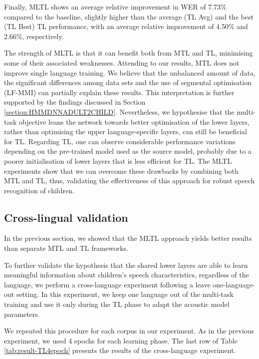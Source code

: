 Finally, \ac{MLTL} shows an average relative improvement in \ac{WER} of 7.73\%  compared to the baseline, slightly higher than the average (\ac{TL} Avg) and the best (\ac{TL} Best) \ac{TL} performance, with an average relative improvement of 4.50\% and 2.66\%, respectively. 

The strength of \ac{MLTL} is that it can benefit both from \ac{MTL} and \ac{TL}, minimising some of their associated weaknesses.
Attending to our results, \ac{MTL} does not improve single language training. We believe that the unbalanced amount of data, the significant differences among data sets and the use of segmental optimisation (\ac{LF-MMI}) can partially explain these results. This interpretation is further supported by the findings discussed in Section \ref{section:HMMDNNADULT2CHILD}. Nevertheless, we hypothesise that the multi-task objective leans the network towards 
better optimisation of the lower layers, rather than optimising the upper language-specific layers, can still be beneficial for \ac{TL}.
Regarding \ac{TL}, one can observe considerable performance variations depending on the pre-trained model used as the source model, probably due to a poorer initialisation of lower layers that is less efficient for \ac{TL}. The \ac{MLTL} experiments show that we can overcome these drawbacks by combining both \ac{MTL} and \ac{TL}, thus, validating the effectiveness of this approach for robust speech recognition of children.


\subsection{Cross-lingual validation}
\label{section:olo}

In the previous section, we showed that the \ac{MLTL} approach yields better results than separate \ac{MTL} and \ac{TL} frameworks.

To further validate the hypothesis that the shared lower layers are able to learn meaningful information about children's speech characteristics, regardless of the language, we perform a cross-language experiment following a leave one-language-out setting. In this experiment, we keep one language out of the multi-task training and use it only during the \ac{TL} phase to adapt the acoustic model parameters. 

We repeated this procedure for each corpus in our experiment. As in the previous experiment, we used 4 epochs for each learning phase. The last row of Table \ref{tab:result-TL4epoch} presents the results of the cross-language experiment.

